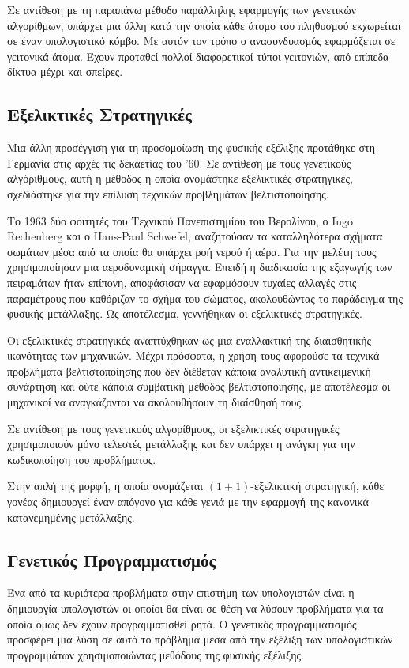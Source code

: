 Σε αντίθεση με τη παραπάνω μέθοδο παράλληλης εφαρμογής των γενετικών αλγορίθμων, υπάρχει μια άλλη κατά την οποία κάθε άτομο του πληθυσμού εκχωρείται σε έναν υπολογιστικό κόμβο. Με αυτόν τον τρόπο ο ανασυνδυασμός εφαρμόζεται σε γειτονικά άτομα. Έχουν προταθεί πολλοί διαφορετικοί τύποι γειτονιών, από επίπεδα δίκτυα μέχρι και σπείρες.\cite{Mitchell1997}

\subsection{Εξελικτικές Στρατηγικές}
Μια άλλη προσέγγιση για τη προσομοίωση της φυσικής εξέλιξης προτάθηκε στη Γερμανία στις αρχές τις δεκαετίας του '60. Σε αντίθεση με τους γενετικούς αλγόριθμους, αυτή η μέθοδος η οποία ονομάστηκε εξελικτικές στρατηγικές, σχεδιάστηκε για την επίλυση τεχνικών προβλημάτων βελτιστοποίησης.

Το 1963 δύο φοιτητές του Τεχνικού Πανεπιστημίου του Βερολίνου, ο Ingo Rechenberg και ο Hans-Paul Schwefel, αναζητούσαν τα καταλληλότερα σχήματα σωμάτων μέσα από τα οποία θα υπάρχει ροή νερού ή αέρα. Για την μελέτη τους χρησιμοποίησαν μια αεροδυναμική σήραγγα. Επειδή η διαδικασία της εξαγωγής των πειραμάτων ήταν επίπονη, αποφάσισαν να εφαρμόσουν τυχαίες αλλαγές στις παραμέτρους που καθόριζαν το σχήμα του σώματος, ακολουθώντας το παράδειγμα της φυσικής μετάλλαξης. Ως αποτέλεσμα, γεννήθηκαν οι εξελικτικές στρατηγικές.

Οι εξελικτικές στρατηγικές αναπτύχθηκαν ως μια εναλλακτική της διαισθητικής ικανότητας των μηχανικών. Μέχρι πρόσφατα, η χρήση τους αφορούσε τα τεχνικά προβλήματα βελτιστοποίησης που δεν διέθεταν κάποια αναλυτική αντικειμενική συνάρτηση και ούτε κάποια συμβατική μέθοδος βελτιστοποίησης, με αποτέλεσμα οι μηχανικοί να αναγκάζονται να ακολουθήσουν τη διαίσθησή τους.

Σε αντίθεση με τους γενετικούς αλγορίθμους, οι εξελικτικές στρατηγικές χρησιμοποιούν μόνο τελεστές μετάλλαξης και δεν υπάρχει η ανάγκη για την κωδικοποίηση του προβλήματος.

Στην απλή της μορφή, η οποία ονομάζεται $(1+1)$-εξελικτική στρατηγική, κάθε γονέας δημιουργεί έναν απόγονο για κάθε γενιά με την εφαρμογή της κανονικά κατανεμημένης μετάλλαξης.
\subsection{Γενετικός Προγραμματισμός}

Ένα από τα κυριότερα προβλήματα στην επιστήμη των υπολογιστών είναι η δημιουργία υπολογιστών οι οποίοι θα είναι σε θέση να λύσουν προβλήματα για τα οποία όμως δεν έχουν προγραμματισθεί ρητά. Ο γενετικός προγραμματισμός προσφέρει μια λύση σε αυτό το πρόβλημα μέσα από την εξέλιξη των υπολογιστικών προγραμμάτων χρησιμοποιώντας μεθόδους της φυσικής εξέλιξης.

